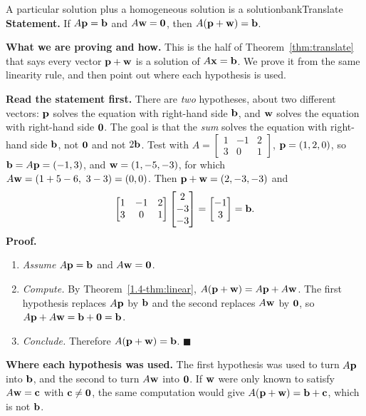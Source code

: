 \documentclass[11pt]{article}
\begin{document}
\begin{exmp}{A particular solution plus a homogeneous solution is a solution}{bankTranslate}
\textbf{Statement.} If $A\mathbf{p}=\mathbf{b}$ and $A\mathbf{w}=\mathbf{0}$, then $A(\mathbf{p}+\mathbf{w})=\mathbf{b}$.

\textbf{What we are proving and how.} This is the half of Theorem~\ref{thm:translate} that says every vector $\mathbf{p}+\mathbf{w}$ is a solution of $A\mathbf{x}=\mathbf{b}$. We prove it from the same linearity rule, and then point out where each hypothesis is used.

\textbf{Read the statement first.} There are \emph{two} hypotheses, about two different vectors: $\mathbf{p}$ solves the equation with right-hand side $\mathbf{b}$, and $\mathbf{w}$ solves the equation with right-hand side $\mathbf{0}$. The goal is that the \emph{sum} solves the equation with right-hand side $\mathbf{b}$, not $\mathbf{0}$ and not $2\mathbf{b}$. Test with $A=\begin{bmatrix}1&-1&2\\3&0&1\end{bmatrix}$, $\mathbf{p}=(1,2,0)$, so $\mathbf{b}=A\mathbf{p}=(-1,3)$, and $\mathbf{w}=(1,-5,-3)$, for which $A\mathbf{w}=(1+5-6,\ 3-3)=(0,0)$. Then $\mathbf{p}+\mathbf{w}=(2,-3,-3)$ and
\[
\begin{bmatrix}1&-1&2\\3&0&1\end{bmatrix}\begin{bmatrix}2\\-3\\-3\end{bmatrix}=\begin{bmatrix}-1\\3\end{bmatrix}=\mathbf{b}.
\]
\textbf{Proof.}
\begin{enumerate}[itemsep=2pt]
  \item \emph{Assume} $A\mathbf{p}=\mathbf{b}$ and $A\mathbf{w}=\mathbf{0}$.
  \item \emph{Compute.} By Theorem~\ref{1.4-thm:linear}, $A(\mathbf{p}+\mathbf{w})=A\mathbf{p}+A\mathbf{w}$. The first hypothesis replaces $A\mathbf{p}$ by $\mathbf{b}$ and the second replaces $A\mathbf{w}$ by $\mathbf{0}$, so $A\mathbf{p}+A\mathbf{w}=\mathbf{b}+\mathbf{0}=\mathbf{b}$.
  \item \emph{Conclude.} Therefore $A(\mathbf{p}+\mathbf{w})=\mathbf{b}$. \qquad$\blacksquare$
\end{enumerate}

\textbf{Where each hypothesis was used.} The first hypothesis was used to turn $A\mathbf{p}$ into $\mathbf{b}$, and the second to turn $A\mathbf{w}$ into $\mathbf{0}$. If $\mathbf{w}$ were only known to satisfy $A\mathbf{w}=\mathbf{c}$ with $\mathbf{c}\neq\mathbf{0}$, the same computation would give $A(\mathbf{p}+\mathbf{w})=\mathbf{b}+\mathbf{c}$, which is not $\mathbf{b}$.
\end{exmp}
\end{document}
